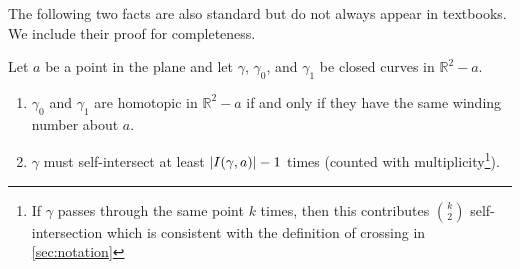 \documentclass[a4paper,11pt]{article}
\DeclarePairedDelimiter{\abs}{\lvert}{\rvert} %
\newcommand{\RR}{\mathbb{R}}
\begin{document}
The following two facts are also standard but do not always appear in textbooks. We include their proof for completeness.

\begin{lemma}\label{lem:winding}
    Let $a$ be a point in the plane and let $\gamma$, $\gamma_0$, and $\gamma_1$ be closed curves in $\RR^2 - a$.
    \begin{enumerate}
        \item $\gamma_0$ and $\gamma_1$ are homotopic in $\RR^2 - a$ if and only if they have the same winding number about $a$.
        \item $\gamma$ must self-intersect at least $\abs{I(\gamma, a)} - 1$ times \textup{(}counted with multiplicity\footnote{If $\gamma$ passes through the same point $k$ times, then this contributes $\binom{k}{2}$ self-intersection which is consistent with the definition of crossing in \cref{sec:notation}}\textup{)}.
    \end{enumerate}
\end{lemma}
\end{document}
